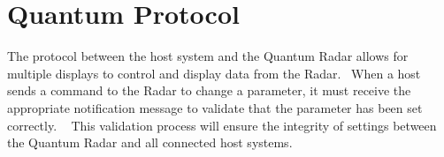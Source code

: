 \hypertarget{index_Protocol}{}\section{Quantum Protocol}\label{index_Protocol}
The protocol between the host system and the Quantum Radar allows for multiple displays to control and display data from the Radar.~\newline
When a host sends a command to the Radar to change a parameter, it must receive the appropriate notification message to validate that the parameter has been set correctly. ~\newline
This validation process will ensure the integrity of settings between the Quantum Radar and all connected host systems.~\newline
